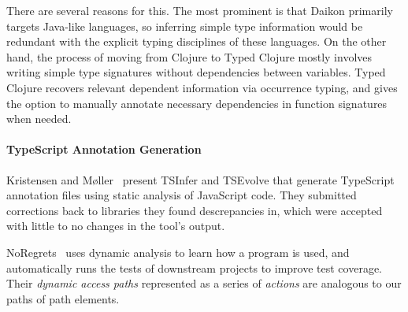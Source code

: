 There are several reasons for this. The most prominent is that Daikon
primarily targets Java-like languages, so inferring simple type information
would be redundant with the explicit typing disciplines of these languages.
On the other hand, the process of moving from Clojure to Typed Clojure
mostly involves writing simple type signatures without dependencies
between variables. Typed Clojure recovers relevant dependent information
via occurrence typing, and gives the option to manually annotate necessary
dependencies in function signatures when needed.


\paragraph{TypeScript Annotation Generation}
Kristensen and M{\o}ller~\cite{kristensen2017inference}
present TSInfer and TSEvolve that generate TypeScript annotation
files using static analysis of JavaScript code. They
submitted corrections back to libraries they found descrepancies in,
which were accepted with little to no changes in the tool's output.

NoRegrets~\cite{noregrets2018} uses dynamic analysis to learn how a program
is used, and automatically runs the tests of downstream projects to
improve test coverage. Their \emph{dynamic access paths} represented as
a series of \emph{actions} are analogous to our paths of path elements.


